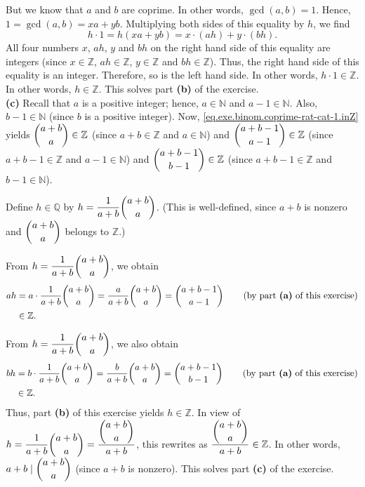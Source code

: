 \documentclass[paper=a4, fontsize=12pt]{scrartcl}%
\theoremstyle{plainsl}
\theoremstyle{definition}
\theoremstyle{remark}
\begin{document}
But we know that $a$ and $b$ are coprime. In other words, $\gcd\left(
a,b\right)  =1$. Hence, $1=\gcd\left(  a,b\right)  =xa+yb$. Multiplying both
sides of this equality by $h$, we find%
\[
h\cdot1=h\left(  xa+yb\right)  =x\cdot\left(  ah\right)  +y\cdot\left(
bh\right)  .
\]
All four numbers $x$, $ah$, $y$ and $bh$ on the right hand side of this
equality are integers (since $x\in\mathbb{Z}$, $ah\in\mathbb{Z}$,
$y\in\mathbb{Z}$ and $bh\in\mathbb{Z}$). Thus, the right hand side of this
equality is an integer. Therefore, so is the left hand side. In other words,
$h\cdot1\in\mathbb{Z}$. In other words, $h\in\mathbb{Z}$. This solves part
\textbf{(b)} of the exercise. \\[0.4cm]

\textbf{(c)} Recall that $a$ is a positive integer; hence, $a\in\mathbb{N}$
and $a-1\in\mathbb{N}$. Also, $b-1\in\mathbb{N}$ (since $b$ is a positive
integer). Now, \eqref{eq.exe.binom.coprime-rat-cat-1.inZ} yields $\dbinom
{a+b}{a}\in\mathbb{Z}$ (since $a+b\in\mathbb{Z}$ and $a\in\mathbb{N}$) and
$\dbinom{a+b-1}{a-1}\in\mathbb{Z}$ (since $a+b-1\in\mathbb{Z}$ and
$a-1\in\mathbb{N}$) and $\dbinom{a+b-1}{b-1}\in\mathbb{Z}$ (since
$a+b-1\in\mathbb{Z}$ and $b-1\in\mathbb{N}$).

Define $h\in\mathbb{Q}$ by $h=\dfrac{1}{a+b}\dbinom{a+b}{a}$. (This is
well-defined, since $a+b$ is nonzero and $\dbinom{a+b}{a}$ belongs to
$\mathbb{Z}$.)

From $h=\dfrac{1}{a+b}\dbinom{a+b}{a}$, we obtain%
\begin{align*}
ah &  =a\cdot\dfrac{1}{a+b}\dbinom{a+b}{a}=\dfrac{a}{a+b}\dbinom{a+b}%
{a}=\dbinom{a+b-1}{a-1}\qquad\left(  \text{by part \textbf{(a)} of this
exercise}\right)  \\
&  \in\mathbb{Z}.
\end{align*}


From $h=\dfrac{1}{a+b}\dbinom{a+b}{a}$, we also obtain%
\begin{align*}
bh &  =b\cdot\dfrac{1}{a+b}\dbinom{a+b}{a}=\dfrac{b}{a+b}\dbinom{a+b}%
{a}=\dbinom{a+b-1}{b-1}\qquad\left(  \text{by part \textbf{(a)} of this
exercise}\right)  \\
&  \in\mathbb{Z}.
\end{align*}
Thus, part \textbf{(b)} of this exercise yields $h\in\mathbb{Z}$. In view of
$h=\dfrac{1}{a+b}\dbinom{a+b}{a}=\dfrac{\dbinom{a+b}{a}}{a+b}$, this rewrites
as $\dfrac{\dbinom{a+b}{a}}{a+b}\in\mathbb{Z}$. In other words, $a+b\mid
\dbinom{a+b}{a}$ (since $a+b$ is nonzero). This solves part \textbf{(c)} of
the exercise. \\[0.4cm]
\end{document}

